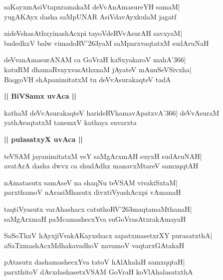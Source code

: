 \documentclass[twoside,12pt,openright]{book}
\def\S{\char'263}
\newcounter{shloka}[chapter]
\def\uvaca#1{\centerline{{\large\textbf{#1}}}}
\begin{document}
\begin{shloka}%
saKayxmAsiVtapxramakaM deVvAnAmasureYH samaM|\\
yugAKAyx dasha saMpUNAR AsiVdavAyxkulaM jagatf
\end{shloka}

\begin{shloka}%
nideVshasAthxyinashAcxpi tayoVdeRVvAsurAH savxyaM|\\
badedhxV balw vimadoRV\S yaM saMparxvaqtatxM sudAruNaH
\end{shloka}

\begin{shloka}%
deVvanAmasurANAM ca GoVraH kaSxyakaroV mahA\char'366|\\
katuRM dhamaRvayxvasAthxnaM jAyateV mAnuSeVSivxha|\\
BaqgoVH shApanimitatxM tu deVvAsurakaqteV tadA
\end{shloka}

\uvaca{|| BiVSamx uvAca ||}
\begin{shloka}%
kathaM deVvAsurakaqteV harideRVhamavApatxvA\char'366|
deVvAsuraM yathAvaqtatxM tanemxV kathaya suvarxta
\end{shloka}

\uvaca{|| pulasatxyX uvAca ||}
\begin{shloka}%
teVSAM jayanimitatxM veY saMgArxmAH suyxH sudAruNAH|\\
avatArA dasha dwvx ca shudAdhx manavxMtareV samxqqtAH
\end{shloka}

\begin{shloka}%
nAmatasutx samAseV na shaqNu teVSAM vivakiSxtaM|\\
parxthamoV nArasiMhasutx divxtiVyashAcxpi vAmanaH
\end{shloka}

\begin{shloka}%
taqtiVyasutx varAhashacx catuthoRV\S maqtamaMthanaH|\\
saMgArxmaH paMcamashecxYva suGoVrasAtxrakAmayaH
\end{shloka}

\begin{shloka}%
SaSoThxV hAyxjiVvakAKayxshacx sapatxmasetxrXY purasatxthA|\\
aSaTxmashAcxMdhakavadhoV navamoV vaqtarxGAtakaH
\end{shloka}

\begin{shloka}%
pAtasutx dashamashecxYva tatoV hAlAhalaH samxqqtaH|\\
parxthitoV dAvxdashasetxVSAM GoVraH koVlAhalasatxthA
\end{shloka}
\end{document}
